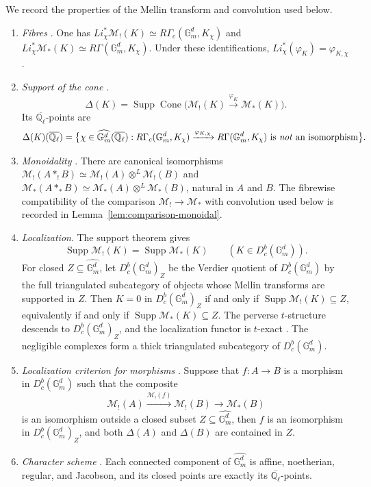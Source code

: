 \documentclass[12pt,reqno]{amsart}
\theoremstyle{definition}
\theoremstyle{plain}
\theoremstyle{definition}
\theoremstyle{remark}
\newcommand{\bbG}{\mathbb{G}}  \newcommand{\bbH}{\mathbb{H}}
\newcommand{\bbQ}{\mathbb{Q}}  \newcommand{\bbR}{\mathbb{R}}
\newcommand{\ol}[1]{\overline{#1}}
\newcommand{\Ql}{\bbQ_{\ell}}
\newcommand{\Db}{D^b_c}
\newcommand{\Gm}{\bbG_m}
\newcommand{\Supp}{\operatorname{Supp}}
\newcommand{\Cone}{\operatorname{Cone}}
\begin{document}
We record the properties of the Mellin transform and convolution used below.
\begin{enumerate}[label=\textup{(GL\arabic*)}, ref=\textup{(GL\arabic*)}]
\item\label{item:GL1} \emph{Fibres} \cite[Cor.~3.3.2]{GabberLoeser1996}.  One has
\(Li_\chi^*\mathscr M_!(K)\simeq
R\Gamma_c(\Gm^d,K_\chi)\) and \(Li_\chi^*\mathscr M_*(K)\simeq R\Gamma(\Gm^d,K_\chi)\).  Under these
identifications, \(Li_\chi^*(\varphi_K)=\varphi_{K,\chi}\)
\cite[Prop.~3.3.4(i)]{GabberLoeser1996}.
\item\label{item:GL2} \emph{Support of the cone} \cite[Def.~3.3.3, Prop.~3.3.4(i)]{GabberLoeser1996}.
\[
        \Delta(K)
        =\Supp\Cone\bigl(\mathscr M_!(K)\xrightarrow{\varphi_K}\mathscr M_*(K)\bigr).
\]
Its \(\ol\Ql\)-points are
\[
        \Delta(K)(\ol\Ql)
        =\bigl\{\chi\in\widehat{\Gm^d}(\ol\Ql):
        R\Gamma_c(\Gm^d,K_\chi)\xrightarrow{\varphi_{K,\chi}}
        R\Gamma(\Gm^d,K_\chi)\text{ is \emph{not} an isomorphism}\bigr\}.
\]
\item\label{item:GL3} \emph{Monoidality} \cite[Prop.~3.3.1(f)]{GabberLoeser1996}.  There are canonical
isomorphisms \(\mathscr M_!(A\ast_!B)\simeq\mathscr M_!(A)\otimes^L\mathscr M_!(B)\) and
\(\mathscr M_*(A\ast_*B)\simeq\mathscr M_*(A)\otimes^L\mathscr M_*(B)\), natural in \(A\) and \(B\).  The
fibrewise compatibility of the comparison \(\mathscr M_!\to\mathscr M_*\) with convolution used below is
recorded in Lemma~\ref{lem:comparison-monoidal}.
\item\label{item:GL4} \emph{Localization}.  The support theorem
\cite[Th.~6.1.1(b)]{GabberLoeser1996} gives
\[
        \Supp\mathscr M_!(K)=\Supp\mathscr M_*(K)
        \qquad(K\in\Db(\Gm^d)).
\]
For closed \(Z\subseteq\widehat{\Gm^d}\), let \(\Db(\Gm^d)_Z\) be the Verdier quotient of
\(\Db(\Gm^d)\) by the full triangulated subcategory of objects whose Mellin transforms are supported in
\(Z\).  Then \(K=0\) in \(\Db(\Gm^d)_Z\) if and only if
\(\Supp\mathscr M_!(K)\subseteq Z\), equivalently if and only if
\(\Supp\mathscr M_*(K)\subseteq Z\).  The perverse \(t\)-structure descends to
\(\Db(\Gm^d)_Z\), and the localization functor is \(t\)-exact
\cite[Prop.~3.6.1, Lem.~3.9.1]{GabberLoeser1996}.
The negligible complexes form a thick triangulated subcategory of \(\Db(\Gm^d)\).
\item\label{item:GL5} \emph{Localization criterion for morphisms}
\cite[Prop.~3.9.2]{GabberLoeser1996}.  Suppose that \(f:A\to B\) is a morphism in \(\Db(\Gm^d)\) such that
the composite
\[
        \mathscr M_!(A)\xrightarrow{\mathscr M_!(f)}\mathscr M_!(B)\longrightarrow\mathscr M_*(B)
\]
is an isomorphism outside a closed subset
\(Z\subseteq\widehat{\Gm^d}\), then \(f\) is an isomorphism in \(\Db(\Gm^d)_Z\), and both \(\Delta(A)\) and
\(\Delta(B)\) are contained in \(Z\).
\item\label{item:GL6} \emph{Character scheme}
\cite[\S\S3.2.2--3.2.3, Props.~A.2.2.2, A.2.2.3]{GabberLoeser1996}.  Each connected component of
\(\widehat{\Gm^d}\) is affine, noetherian, regular, and Jacobson, and its closed points are exactly
its \(\ol\Ql\)-points.
\end{enumerate}
\end{document}
